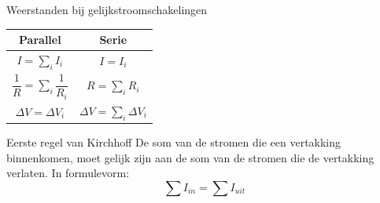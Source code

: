 \begin{pro}{Weerstanden bij gelijkstroomschakelingen}
    \begin{center}
        \def\arraystretch{1.5}
        \begin{tabular}{c|c}
             Parallel & Serie \\ \hline
             $ I = \sum_i I_i $ & $ I = I_i$ \\
             $ \dfrac{1}{R} = \sum_i \dfrac{1}{R_i} $ & $R = \sum_i R_i$ \\
             $ \Delta V = \Delta V_i $ &  $ \Delta V = \sum_i \Delta V_i $
        \end{tabular}
    \end{center}
\end{pro}



\begin{theo}{Eerste regel van Kirchhoff}
     De som van de stromen die een vertakking binnenkomen, moet gelijk zijn aan de som van de stromen die de vertakking verlaten. In formulevorm:
     \begin{equation*}
         \sum I_{in} = \sum I_{uit}
     \end{equation*}
     \vspace{-0.5cm}
\end{theo}


